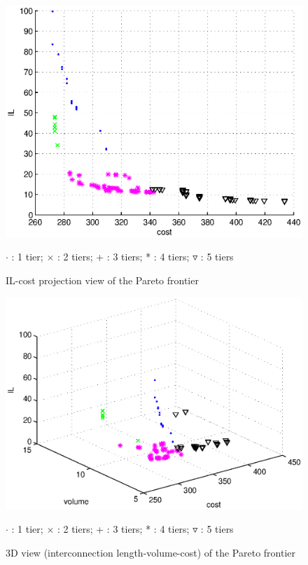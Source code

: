 \begin{figure}[h!]
\begin{center}
\includegraphics[width=\textwidth]{ultiplot1_color.eps}
\begin{footnotesize}
$\cdot$ : 1 tier; $\times$ : 2 tiers; + : 3 tiers; * : 4 tiers; $\triangledown$ : 5 tiers\\
\end{footnotesize}
\caption{IL-cost projection view of the Pareto frontier}
\label{fig:ilcview}
\end{center}
\end{figure}

\begin{figure}[h!]
\begin{center}
\includegraphics[width=\textwidth]{ultiplot_color.eps}
\begin{small}
$\cdot$ : 1 tier; $\times$ : 2 tiers; + : 3 tiers; * : 4 tiers; $\triangledown$ : 5 tiers
\end{small}
\caption{3D view (interconnection length-volume-cost) of the Pareto frontier}
\label{fig:ds3dview}
\end{center}
\end{figure}

